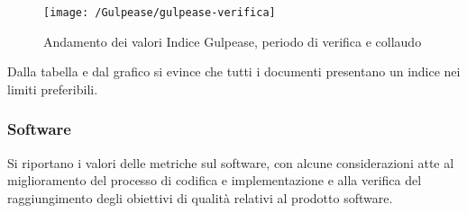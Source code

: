 \documentclass[openany,12pt,a4paper]{report}
\begin{document}
\begin{itemize}
	\begin{figure}[H]
		\texttt{[image: /Gulpease/gulpease-verifica]}
		\centering
		\caption{Andamento dei valori Indice Gulpease, periodo di verifica e collaudo}
	\end{figure}
	
	Dalla tabella e dal grafico si evince che tutti i documenti presentano un indice nei limiti preferibili.	
\end{itemize}

\subsubsection{Software}

Si riportano i valori delle metriche sul software, con alcune considerazioni atte al miglioramento del processo di codifica e implementazione e alla verifica del raggiungimento degli obiettivi di qualità relativi al prodotto software.
\end{document}
